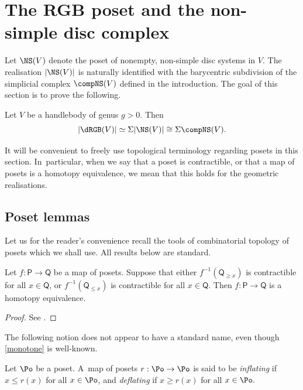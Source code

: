 \section{The RGB poset and the non-simple disc complex} \label{s:poset}

Let $\NS(V)$ denote the poset of nonempty, non-simple disc systems in $V$. The realisation $|\NS(V)|$ is naturally identified with the barycentric subdivision of the simplicial complex $\compNS(V)$ defined in the introduction. The goal of this section is to prove the following.
\begin{thm}\label{thm:simplifying}Let $V$ be a handlebody of genus $g>0$. Then
\[
|\dRGB(V)| \simeq \Sigma |\NS(V)| \cong \Sigma \compNS(V).
\]
\end{thm}

It will be convenient to freely use topological terminology regarding posets in this section. In~particular, when we say \eg that a poset is contractible, or that a map of posets is a homotopy equivalence, we mean that this holds for the geometric realisations.

\subsection{Poset lemmas}
Let us for the reader's convenience recall the tools of combinatorial topology of posets which we shall use. All results below are standard.

\begin{lem} \label{lemma:fibre_lemma} Let $f:\mathsf P \to \mathsf Q$ be a map of posets. Suppose that either $f^{-1}(\mathsf Q_{\geq x})$ is contractible for all $x \in \mathsf Q$, or $f^{-1}(\mathsf Q_{\leq x})$ is contractible for all $x \in \mathsf Q$. Then $f \colon \mathsf P\to\mathsf Q $ is a homotopy equivalence. \end{lem}

\begin{proof}
See \cite[Prop.\,1.6]{quillen-homotopyproperties}.
\end{proof}

The following notion does not appear to have a standard name, even though \cref{monotone} is well-known.

\begin{defn}
Let $\Po$ be a poset. A~map of posets $r:\Po \to \Po$ is said to be \emph{inflating} if $x \leq r(x)$ for all $x \in \Po$, and \emph{deflating} if $x \geq r(x)$ for all $x \in \Po.$
\end{defn}

